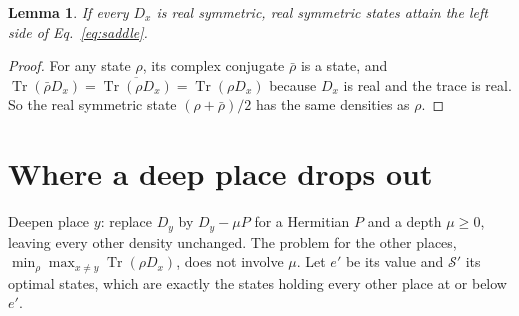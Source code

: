 \documentclass[aps,prd,reprint,superscriptaddress]{revtex4-2}
\newtheorem{lemma}{Lemma}
\begin{document}
\begin{lemma}\label{lem:real}
If every $D_x$ is real symmetric, real symmetric states attain the left side of Eq.~\eqref{eq:saddle}.
\end{lemma}
\begin{proof}
For any state $\rho$, its complex conjugate $\bar\rho$ is a state, and $\operatorname{Tr}(\bar\rho D_x) = \overline{\operatorname{Tr}(\rho D_x)} = \operatorname{Tr}(\rho D_x)$ because $D_x$ is real and the trace is real. So the real symmetric state $(\rho + \bar\rho)/2$ has the same densities as $\rho$.
\end{proof}

\section{Where a deep place drops out}
\label{app:dropout}

Deepen place $y$: replace $D_y$ by $D_y - \mu P$ for a Hermitian $P$ and a depth $\mu \ge 0$, leaving every other density unchanged. The problem for the other places, $\min_\rho \max_{x\neq y} \operatorname{Tr}(\rho D_x)$, does not involve $\mu$. Let $e'$ be its value and $\mathcal{S}'$ its optimal states, which are exactly the states holding every other place at or below $e'$.
\end{document}
